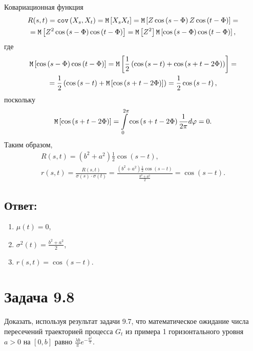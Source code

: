 \documentclass[12pt]{article}
\begin{document}
    Ковариационная функция
    \begin{multline*}
        R(s,t)
        = \mathtt{cov} \left ( X_s, X_t \right )
        = \mathtt{M} \left [ X_s X_t \right ]
        = \mathtt{M} \left [ Z \cos \left ( s - \Phi \right ) Z \cos \left ( t - \Phi \right ) \right ] = \\
        = \mathtt{M} \left [ Z^2 \cos \left ( s - \Phi \right ) \cos \left ( t - \Phi \right ) \right ]
        = \mathtt{M} \left [ Z^2 \right ] \mathtt{M} \left [ \cos \left ( s - \Phi \right ) \cos \left ( t - \Phi \right ) \right ],
    \end{multline*}
    где
    \begin{multline*}
        \mathtt{M} \left [ \cos \left ( s - \Phi \right ) \cos \left ( t - \Phi \right ) \right ]
        = \mathtt{M} \left [ \frac{1}{2} \left ( \cos \left ( s - t \right ) + \cos \left ( s + t - 2 \Phi \right ) \right ) \right ] = \\
        = \frac{1}{2} \left ( \cos \left ( s - t \right ) + \mathtt{M} \left [ \cos \left ( s + t - 2 \Phi \right ) \right ] \right )
        = \frac{1}{2} \cos \left ( s - t \right ),
    \end{multline*}
    поскольку
    \[
        \mathtt{M} \left [ \cos \left ( s + t - 2 \Phi \right ) \right ]
        = \int \limits_0^{2 \pi} \cos \left ( s + t - 2 \Phi \right ) \frac{1}{2 \pi} d \varphi
        = 0 .
    \]
    Таким образом,
    \begin{gather*}
        R(s,t) = \left ( b^2 + a^2 \right ) \frac{1}{2} \cos \left ( s - t \right ), \\
        r(s,t)
        = \frac{R(s,t)}{\sigma(s) \cdot \sigma(t)}
        = \frac{\left ( b^2 + a^2 \right ) \frac{1}{2} \cos \left ( s - t \right )}{\frac{b^2 + a^2}{2}}
        = \cos \left ( s - t \right ).
    \end{gather*}

    \subsection*{Ответ:}
    \begin{enumerate}
        \item $\mu(t) = 0$,
        \item $\sigma^2(t) = \frac{b^2 + a^2}{2}$,
        \item $r(s,t) = \cos \left ( s - t \right )$.
    \end{enumerate}

    \section*{Задача 9.8}
    Доказать, используя результат задачи 9.7, что математическое ожидание числа пересечений траекторией процесса $G_t$ из примера 1 горизонтального уровня $a>0$ на $\left [ 0, b \right ]$
    равно $\frac{\lambda b}{\pi} e^{-\frac{a^2}{2}}$.
\end{document}
